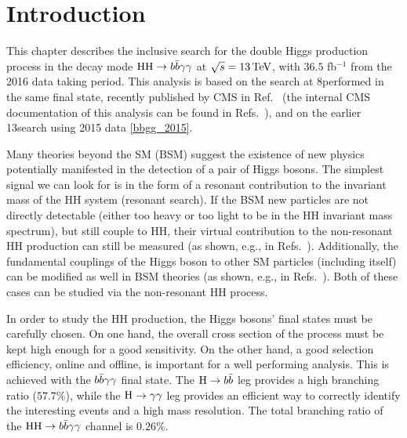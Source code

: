 \section{Introduction}
This chapter describes the inclusive search for the double Higgs production process in the decay
mode $\mathrm{H}\mathrm{H} \to b\bar{b}\gamma\gamma $ at $\sqrt{s}=13\,\text{Te\hspace{-.08em}V}$, with $36.5$ fb$^{-1}$ from the 2016 data taking period. 
This analysis is based on the search at 8\TeV performed in the same final state, recently published by CMS in
Ref.~\cite{HIG-13-032} (the internal CMS documentation of this analysis can be found in Refs.~\cite{AN-13-075,AN-14-118}), and 
on the earlier 13\TeV search using 2015 data \ref{bbgg_2015}.

Many theories beyond the SM (BSM) suggest the existence of new physics potentially manifested in the detection of a pair of Higgs bosons. 
The simplest signal we can look for is in the form of a resonant contribution to the invariant mass of the HH system (resonant search). 
If the BSM new particles are not directly detectable (either too heavy or too light to be in the HH invariant mass spectrum), but still couple to HH, their virtual contribution to the non-resonant HH production can still be measured (as shown, e.g., in Refs.~\cite{Dawson:2015oha,Cao:2013si}). Additionally, the fundamental couplings of the Higgs boson to other SM particles (including itself) can be modified as well in BSM theories (as shown, e.g., in Refs.~\cite{Mangano:2002ea,Grober:2015cwa}). Both of these cases can be studied via the non-resonant HH process.

In order to study the HH production, the Higgs bosons' final states must be carefully chosen. On one hand, the overall cross section of the process must be kept high enough for a good sensitivity. On the other hand, a good selection efficiency, online and offline, is important for a well performing analysis. This is achieved with the $b\bar{b}\gamma\gamma $ final state. The $\mathrm{H}\to b\bar{b}$ leg provides a high branching ratio ($57.7\%$), while the $\mathrm{H}\to\gamma\gamma$ leg provides an efficient way to correctly identify the interesting events and a high mass resolution. The total branching ratio of the $\mathrm{H}\mathrm{H}\to b\bar{b}\gamma\gamma $  channel is $0.26\%$.


